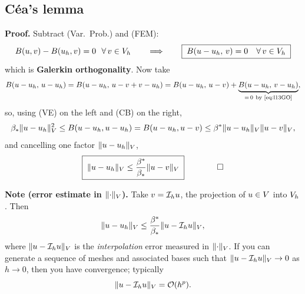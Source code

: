 \subsection*{C\'ea's lemma}

\medskip\noindent{}

\medskip\noindent
\textbf{Proof.} Subtract (Var.\ Prob.) and (FEM):
\begin{equation}\label{eq:l13GO}
  B(u,v)-B(u_{h},v)=0\ \ \forall\,v\in V_{h}
  \qquad\Longrightarrow\qquad
  \boxed{\;B(u-u_{h},\,v)=0\quad\forall\,v\in V_{h}\;}
\end{equation}
which is \textbf{Galerkin orthogonality}. Now take
\begin{equation}\label{eq:l13cea1}
  B(u-u_{h},\,u-u_{h})=B(u-u_{h},\,u-v+v-u_{h})
   =B(u-u_{h},\,u-v)+\underbrace{B(u-u_{h},\,v-u_{h})}_{=\,0\ \text{by \eqref{eq:l13GO}}} ,
\end{equation}
so, using (VE) on the left and (CB) on the right,
\begin{equation}\label{eq:l13cea2}
  \beta_{*}\lVert u-u_{h}\rVert^{2}_{V}\le B(u-u_{h},u-u_{h})=B(u-u_{h},u-v)
   \le\beta^{*}\lVert u-u_{h}\rVert_{V}\lVert u-v\rVert_{V},
\end{equation}
and cancelling one factor $\lVert u-u_{h}\rVert_{V}$,
\begin{equation}\label{eq:l13cea3}
  \boxed{\;\lVert u-u_{h}\rVert_{V}\le\frac{\beta^{*}}{\beta_{*}}\lVert u-v\rVert_{V}\;}
  \qquad\qed
\end{equation}

\medskip\noindent
\textbf{Note (error estimate in $\lVert\cdot\rVert_{V}$).} Take
$v=\mathcal{I}_{h} u$, the projection of $u\in V$ into $V_{h}$. Then
\begin{equation}\label{eq:l13ceainterp}
  \lVert u-u_{h}\rVert_{V}\le\frac{\beta^{*}}{\beta_{*}}\lVert u-\mathcal{I}_{h} u\rVert_{V},
\end{equation}
where $\lVert u-\mathcal{I}_{h} u\rVert_{V}$ is the \emph{interpolation} error measured in
$\lVert\cdot\rVert_{V}$. If you can generate a sequence of meshes and associated
bases such that $\lVert u-\mathcal{I}_{h} u\rVert_{V}\to0$ as $h\to0$, then you have
convergence; typically
\begin{equation}\label{eq:l13rate}
  \lVert u-\mathcal{I}_{h} u\rVert_{V}=\mathcal{O}(h^{p}).
\end{equation}

